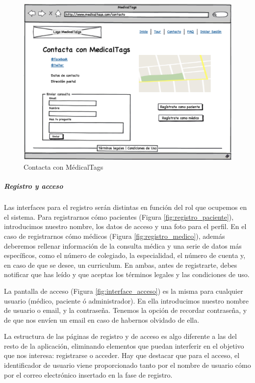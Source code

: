 		
		\begin{figure}[H]
		  \centering
		    \includegraphics[width=12cm]{img/eps/6_Contacto.eps}
		  \caption{Contacta con MédicalTags}
		  \label{fig:contacto}
		\end{figure}
	
			
	
		\subparagraph{Registro y acceso} %
			\label{par:registro_y_acceso}
	
			Las interfaces para el registro serán distintas en función del rol que ocupemos en el sistema. Para registrarnos cómo pacientes (Figura \ref{fig:registro_paciente}), introducimos nuestro nombre, los datos de acceso y una foto para el perfil. En el caso de registrarnos cómo médicos (Figura \ref{fig:registro_medico}), además deberemos rellenar información de la consulta médica y una serie de datos más específicos, como el número de colegiado, la especialidad, el número de cuenta y, en caso de que se desee, un curriculum. En ambas, antes de registrarte, debes notificar que has leído y que aceptas los términos legales y las condiciones de uso.
			
			La pantalla de acceso (Figura \ref{fig:interface_acceso}) es la misma para cualquier usuario (médico, paciente ó administrador). En ella introducimos nuestro nombre de usuario o email, y la contraseña. Tenemos la opción de recordar contraseña, y de que nos envíen un email en caso de habernos olvidado de ella.
			
			La estructura de las páginas de registro y de acceso es algo diferente a las del resto de la aplicación, eliminando elementos que puedan interferir en el objetivo que nos interesa: registrarse o acceder. Hay que destacar que para el acceso, el identificador de usuario viene proporcionado tanto por el nombre de usuario cómo por el correo electrónico insertado en la fase de registro.
					
